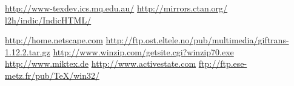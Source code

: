 \begin{htmlonly}
%
\internal{}%
%
%
%
%
%
%

\newcommand{\texdev}[1]{\htmladdnormallink
 {\texdevURL/#1}{\texdevURL/#1}}
\newcommand{\indichtml}{l2h/indic/IndicHTML/}

\end{htmlonly}

\newcommand{\TUGurl}{\url{http://www.tug.org}}

\newcommand{\texdevURL}{http://www-texdev.ics.mq.edu.au/}
\newcommand{\Unicode}{\htmladdnormallinkfoot
 {Unicode}{http://www.unicode.org/}}
\newcommand{\IndicHTML}{
 {Indic\TeX/HTML}}

\usepackage{array}

\newcommand{\Cs}[1]{{\upshape`\,\texttt{-#1}\,'}}
\newcommand{\Ve}[1]{\index{#1@\texttt{#1}}{\upshape`\,\texttt{#1}\,'}}
\newcommand{\Lc}[1]{{\upshape\ttfamily\char92#1}}
\newcommand{\Tc}[1]{{\upshape\ttfamily\char92#1}}

\newcommand{\ctanTUG}[1]{TUG's searchable CTAN site\footnote{\ctanTUGurl}}
\newcommand{\ctanURL}{CTAN: \penalty-200\ctanurl}
\newcommand{\ctanURLbr}{CTAN: \newline\ctanurl}
\urldef\texdev\url{http://www-texdev.ics.mq.edu.au/}
\urldef\ctanTUGurl\url{http://mirrors.ctan.org/}
\urldef\indichtml\url{l2h/indic/IndicHTML/}

\urldef\NetscapeHome\url{http://home.netscape.com}
\urldef\giftransURL\url{http://ftp.ost.eltele.no/pub/multimedia/giftrans-1.12.2.tar.gz}
\urldef\WinZipURL\url{http://www.winzip.com/getsite.cgi?winzip70.exe}
\urldef\MikTeXURL\url{http://www.miktex.de}
\urldef\ActiveStateURL\url{http://www.activestate.com}
\urldef\NetpbmWinURL\url{ftp://ftp.ese-metz.fr/pub/TeX/win32/}

\begin{htmlonly}
\newcommand{\NetscapeHome}{\url{http://home.netscape.com}}
\newcommand{\giftransURL}{\url{http://ftp.ost.eltele.no/pub/multimedia/giftrans-1.12.2.tar.gz}}
\newcommand{\WinZipURL}{\url{http://www.winzip.com/getsite.cgi?winzip70.exe}}
\newcommand{\MikTeXURL}{\url{http://www.miktex.de}}
\newcommand{\ActiveStateURL}{\url{http://www.activestate.com}}
\newcommand{\NetpbmWinURL}{\url{ftp://ftp.ese-metz.fr/pub/TeX/win32/}}
\end{htmlonly}



\def\mathsmiley{\smiley\,}


